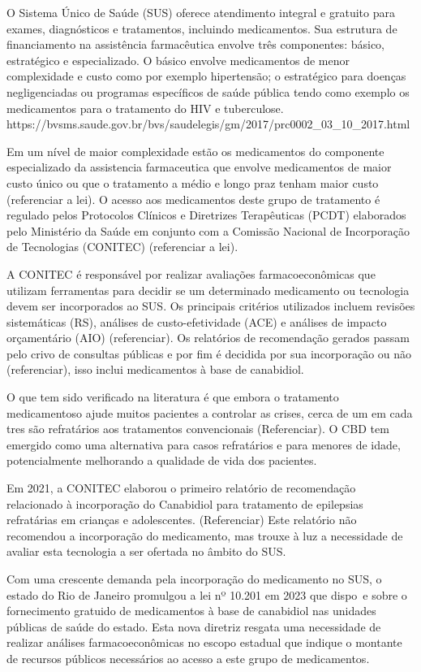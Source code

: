 \documentclass[article,a4paper,12pt,brazil,sumario=tradicional]{abntex2}
\begin{document}
O Sistema Único de Saúde (SUS) oferece atendimento integral e gratuito para exames, diagnósticos e tratamentos, incluindo medicamentos. Sua estrutura de financiamento na assistência farmacêutica envolve três componentes: básico, estratégico e especializado. O básico envolve medicamentos de menor complexidade e custo como por exemplo hipertensão; o estratégico para doenças negligenciadas ou programas específicos de saúde pública tendo como exemplo os medicamentos para o tratamento do HIV e tuberculose.
https://bvsms.saude.gov.br/bvs/saudelegis/gm/2017/prc0002_03_10_2017.html

Em um nível de maior complexidade estão os medicamentos do componente especializado da assistencia farmaceutica que envolve medicamentos de maior custo único ou que o tratamento a médio e longo praz tenham maior custo (referenciar a lei). O acesso aos medicamentos deste grupo de tratamento é regulado pelos Protocolos Clínicos e Diretrizes Terapêuticas (PCDT) elaborados pelo Ministério da Saúde em conjunto com a Comissão Nacional de Incorporação de Tecnologias (CONITEC) (referenciar a lei). 

A CONITEC é responsável por realizar avaliações farmacoeconômicas que utilizam ferramentas para decidir se um determinado medicamento ou tecnologia devem ser incorporados ao SUS. Os principais critérios utilizados incluem revisões sistemáticas (RS), análises de custo-efetividade (ACE) e análises de impacto orçamentário (AIO) (referenciar). Os relatórios de recomendação gerados passam pelo crivo de consultas públicas e por fim é decidida por sua incorporação ou não (referenciar), isso inclui medicamentos à base de canabidiol.

O que tem sido verificado na literatura é que embora o tratamento medicamentoso ajude muitos pacientes a controlar as crises, cerca de um em cada tres são refratários aos tratamentos convencionais (Referenciar). O CBD tem emergido como uma alternativa para casos refratários e para menores de idade, potencialmente melhorando a qualidade de vida dos pacientes.

Em 2021, a CONITEC elaborou o primeiro relatório de recomendação relacionado à incorporação do Canabidiol para tratamento de epilepsias refratárias em crianças e adolescentes. (Referenciar) Este relatório não recomendou a incorporação do medicamento, mas trouxe à luz a necessidade de avaliar esta tecnologia a ser ofertada no âmbito do SUS.

Com uma crescente demanda pela incorporação do medicamento no SUS, o estado do Rio de Janeiro promulgou a lei nº 10.201 em 2023 que dispo~e sobre o fornecimento gratuido de medicamentos à base de canabidiol nas unidades públicas de saúde do estado. Esta nova diretriz resgata uma necessidade de realizar análises farmacoeconômicas no escopo estadual que indique o montante de recursos públicos necessários ao acesso a este grupo de medicamentos.
\end{document}
